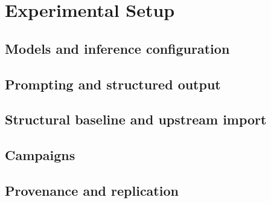 \section{Experimental Setup}
\label{sec:experimental-setup}


\subsection{Models and inference configuration}
\label{sec:experimental-setup:models}

\subsection{Prompting and structured output}
\label{sec:experimental-setup:prompts}

\subsection{Structural baseline and upstream import}
\label{sec:experimental-setup:baseline}

\subsection{Campaigns}
\label{sec:experimental-setup:campaigns}

\subsection{Provenance and replication}
\label{sec:experimental-setup:provenance}

